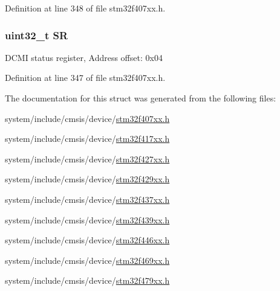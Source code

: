 Definition at line 348 of file stm32f407xx.\+h.

\subsubsection[{\texorpdfstring{SR}{SR}}]{ uint32\+\_\+t SR}\hypertarget{struct_d_c_m_i___type_def_af6aca2bbd40c0fb6df7c3aebe224a360}{}\label{struct_d_c_m_i___type_def_af6aca2bbd40c0fb6df7c3aebe224a360}
D\+C\+MI status register, Address offset\+: 0x04 

Definition at line 347 of file stm32f407xx.\+h.



The documentation for this struct was generated from the following files\+:\begin{DoxyCompactItemize}
\item 
system/include/cmsis/device/\hyperlink{stm32f407xx_8h}{stm32f407xx.\+h}\item 
system/include/cmsis/device/\hyperlink{stm32f417xx_8h}{stm32f417xx.\+h}\item 
system/include/cmsis/device/\hyperlink{stm32f427xx_8h}{stm32f427xx.\+h}\item 
system/include/cmsis/device/\hyperlink{stm32f429xx_8h}{stm32f429xx.\+h}\item 
system/include/cmsis/device/\hyperlink{stm32f437xx_8h}{stm32f437xx.\+h}\item 
system/include/cmsis/device/\hyperlink{stm32f439xx_8h}{stm32f439xx.\+h}\item 
system/include/cmsis/device/\hyperlink{stm32f446xx_8h}{stm32f446xx.\+h}\item 
system/include/cmsis/device/\hyperlink{stm32f469xx_8h}{stm32f469xx.\+h}\item 
system/include/cmsis/device/\hyperlink{stm32f479xx_8h}{stm32f479xx.\+h}\end{DoxyCompactItemize}
